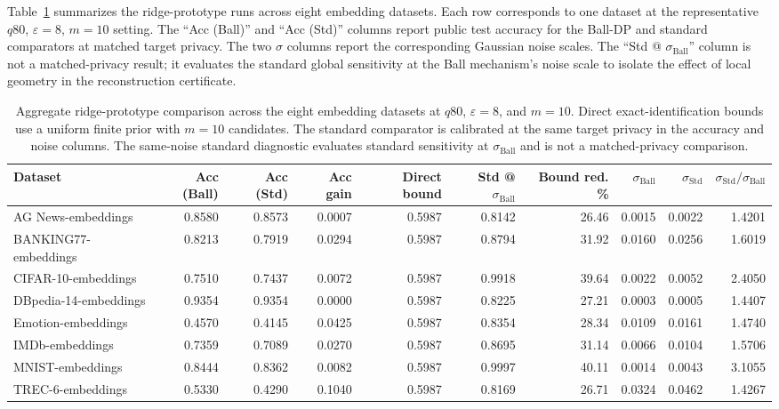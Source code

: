 \documentclass[11pt,a4paper]{report}
\theoremstyle{plain}
\theoremstyle{definition}
\theoremstyle{remark}
\begin{document}
Table~\ref{tab:aggregate-summary} summarizes the ridge-prototype runs across eight embedding datasets.  Each row corresponds to one dataset at the representative $q80$, $\varepsilon=8$, $m=10$ setting.  The ``Acc (Ball)'' and ``Acc (Std)'' columns report public test accuracy for the Ball-DP and standard comparators at matched target privacy.  The two $\sigma$ columns report the corresponding Gaussian noise scales.  The ``Std @ $\sigma_{\mathrm{Ball}}$'' column is not a matched-privacy result; it evaluates the standard global sensitivity at the Ball mechanism's noise scale to isolate the effect of local geometry in the reconstruction certificate.

\begin{table}[t]
\centering
\caption{Aggregate ridge-prototype comparison across the eight embedding datasets at $q80$, $\varepsilon=8$, and $m=10$.  Direct exact-identification bounds use a uniform finite prior with $m=10$ candidates.  The standard comparator is calibrated at the same target privacy in the accuracy and noise columns.  The same-noise standard diagnostic evaluates standard sensitivity at $\sigma_{\mathrm{Ball}}$ and is not a matched-privacy comparison.}
\label{tab:aggregate-summary}
\scriptsize
\setlength{\tabcolsep}{3pt}
\begin{tabular}{lrrrrrrrrr}
\toprule
Dataset
& Acc (Ball)
& Acc (Std)
& Acc gain
& Direct bound
& Std @ $\sigma_{\mathrm{Ball}}$
& Bound red. \%
& $\sigma_{\mathrm{Ball}}$
& $\sigma_{\mathrm{Std}}$
& $\sigma_{\mathrm{Std}}/\sigma_{\mathrm{Ball}}$ \\
\midrule
AG News-embeddings          & 0.8580 & 0.8573 & 0.0007 & 0.5987 & 0.8142 & 26.46 & 0.0015 & 0.0022 & 1.4201 \\
BANKING77-embeddings        & 0.8213 & 0.7919 & 0.0294 & 0.5987 & 0.8794 & 31.92 & 0.0160 & 0.0256 & 1.6019 \\
CIFAR-10-embeddings         & 0.7510 & 0.7437 & 0.0072 & 0.5987 & 0.9918 & 39.64 & 0.0022 & 0.0052 & 2.4050 \\
DBpedia-14-embeddings       & 0.9354 & 0.9354 & 0.0000 & 0.5987 & 0.8225 & 27.21 & 0.0003 & 0.0005 & 1.4407 \\
Emotion-embeddings          & 0.4570 & 0.4145 & 0.0425 & 0.5987 & 0.8354 & 28.34 & 0.0109 & 0.0161 & 1.4740 \\
IMDb-embeddings             & 0.7359 & 0.7089 & 0.0270 & 0.5987 & 0.8695 & 31.14 & 0.0066 & 0.0104 & 1.5706 \\
MNIST-embeddings            & 0.8444 & 0.8362 & 0.0082 & 0.5987 & 0.9997 & 40.11 & 0.0014 & 0.0043 & 3.1055 \\
TREC-6-embeddings           & 0.5330 & 0.4290 & 0.1040 & 0.5987 & 0.8169 & 26.71 & 0.0324 & 0.0462 & 1.4267 \\
\bottomrule
\end{tabular}
\end{table}
\end{document}
